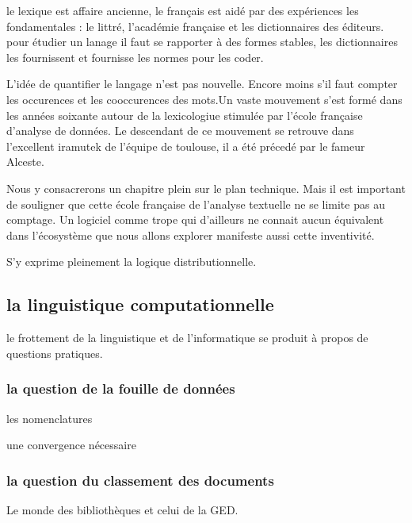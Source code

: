 \documentclass[
]{book}
\begin{document}
le lexique est affaire ancienne, le français est aidé par des expériences les fondamentales : le littré, l'académie française et les dictionnaires des éditeurs. pour étudier un lanage il faut se rapporter à des formes stables, les dictionnaires les fournissent et fournisse les normes pour les coder.

L'idée de quantifier le langage n'est pas nouvelle. Encore moins s'il faut compter les occurences et les cooccurences des mots.Un vaste mouvement s'est formé dans les années soixante autour de la lexicologiue stimulée par l'école française d'analyse de données. Le descendant de ce mouvement se retrouve dans l'excellent iramutek de l'équipe de toulouse, il a été précedé par le fameur Alceste.

Nous y consacrerons un chapitre plein sur le plan technique. Mais il est important de souligner que cette école française de l'analyse textuelle ne se limite pas au comptage. Un logiciel comme trope qui d'ailleurs ne connait aucun équivalent dans l'écosystème que nous allons explorer manifeste aussi cette inventivité.

S'y exprime pleinement la logique distributionnelle.

\hypertarget{la-linguistique-computationnelle}{%
\subsection{la linguistique computationnelle}\label{la-linguistique-computationnelle}}

le frottement de la linguistique et de l'informatique se produit à propos de questions pratiques.

\hypertarget{la-question-de-la-fouille-de-donnuxe9es}{%
\subsubsection{la question de la fouille de données}\label{la-question-de-la-fouille-de-donnuxe9es}}

les nomenclatures

une convergence nécessaire

\hypertarget{la-question-du-classement-des-documents}{%
\subsubsection{la question du classement des documents}\label{la-question-du-classement-des-documents}}

Le monde des bibliothèques et celui de la GED.
\end{document}
